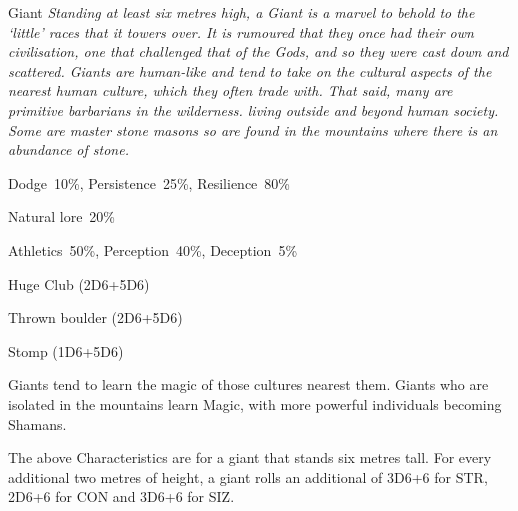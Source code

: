 \begin{monsterbox}{Giant}
	\textit{Standing at least six metres high, a Giant is a marvel to behold to the ‘little’ races that it towers over. It is rumoured that they once had their own civilisation, one that challenged that of the Gods, and so they were cast down and scattered. Giants are human-like and tend to take on the cultural aspects of the nearest human culture, which they often trade with. That said, many are primitive barbarians in the wilderness. living outside and beyond human society. Some are master stone masons so are found in the mountains where there is an abundance of stone. }\\
	\rpghline
	\basics[%
        hitpoints  = 44,
	majorwound = 22,
	damagemodifier = +5D6,
	powerpoints = 11,
	movementrate = 30m,
	armor = Tough Hide (3AP),
	plunderrating = 1-5
	]
	\rpghline%
	\stats[ %
		STR = 9D6+18 (49),
		CON = 6D6+18 (39),
		DEX = 2D6+3  (10),
		SIZ = 9D6+18 (49),
		INT = 3D6    (11),
		POW = 3D6    (11),
		CHA = 2D6    (7)
	]
	\rpghline%
	\begin{rpg-monsteraction}[Resistances]
		Dodge~10\%, Persistence~25\%, Resilience~80\%
	\end{rpg-monsteraction}
	\begin{rpg-monsteraction}[Knowledge]
    		Natural lore~20\%
	\end{rpg-monsteraction}
	\begin{rpg-monsteraction}[Practical]
		Athletics~50\%, Perception~40\%, Deception~5\%
	\end{rpg-monsteraction}
	\begin{rpg-monsteraction}
		Huge Club (2D6+5D6)
	\end{rpg-monsteraction}
	\begin{rpg-monsteraction}
		Thrown boulder (2D6+5D6)
	\end{rpg-monsteraction}
	\begin{rpg-monsteraction}
		Stomp (1D6+5D6)
	\end{rpg-monsteraction}
	\begin{rpg-monsteraction}[Supernatural]
		Giants tend to learn the magic of those cultures nearest them. Giants who are isolated in the mountains learn Magic, with more powerful individuals becoming Shamans.
	\end{rpg-monsteraction}
	\begin{rpg-monsteraction}
		The above Characteristics are for a giant that stands six metres tall. For every additional two metres of height, a giant rolls an additional of 3D6+6 for STR, 2D6+6 for CON and 3D6+6 for SIZ.
	\end{rpg-monsteraction}
\end{monsterbox}

